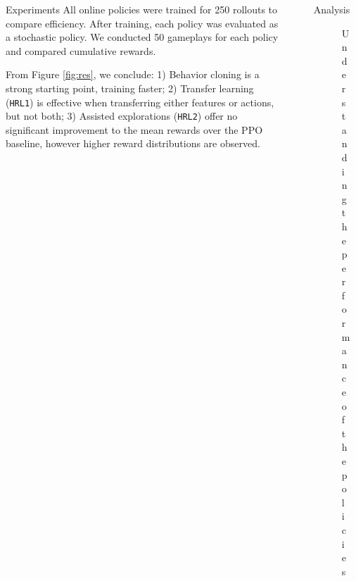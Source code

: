 \documentclass[final]{beamer}
\newlength{\sepwidth}
\newlength{\colwidth}
\newcommand{\separatorcolumn}{\begin{column}{\sepwidth}\end{column}}
\begin{document}
\begin{frame}[t]
\begin{columns}[t]
\begin{column}{\colwidth}
\begin{block}{Experiments}
  All online policies were trained for 250 rollouts to compare efficiency.
  After training, each policy was evaluated as a stochastic policy.
  We conducted 50 gameplays for each policy and compared cumulative rewards.
  
  From Figure \ref{fig:res}, we conclude: 
  \textcolor{cardinalred}{1)} Behavior cloning is a strong starting point, training faster;
  \textcolor{cardinalred}{2)} Transfer learning (\texttt{HRL1}) is effective when transferring either 
  features or actions, but not both;
  \textcolor{cardinalred}{3)} Assisted explorations (\texttt{HRL2}) offer no significant improvement 
  to the mean rewards over the PPO baseline, however higher reward distributions are observed.
    


  \end{block}

\end{column}

\separatorcolumn

\begin{column}{\colwidth}

  \begin{block}{Analysis}
    \begin{figure}[H]%
      \centering
      \hfill
      \hfill
      \caption{Understanding the performance of the policies
      }%
      \label{fig:analysis}%
    \end{figure}



\end{block}
\end{column}
\end{columns}
\end{frame}
\end{document}
